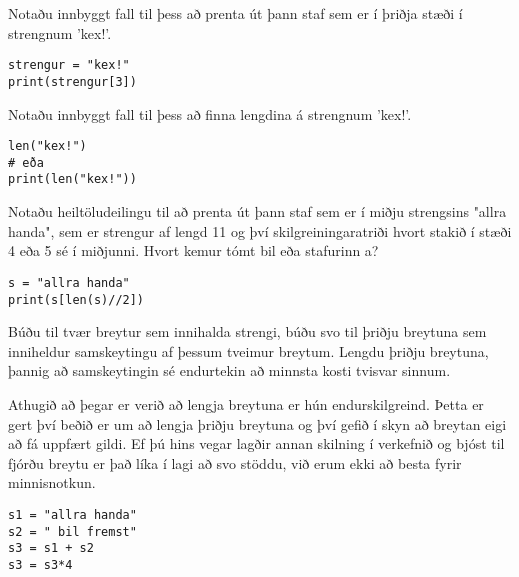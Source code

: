 \begin{exercise}\label{str4}
	Notaðu innbyggt fall til þess að prenta út þann staf sem er í þriðja stæði í strengnum 'kex!'.
\end{exercise}
\begin{Answer}[ref={str4}]
\begin{lstlisting}
strengur = "kex!"
print(strengur[3])\end{lstlisting}
\end{Answer}

\begin{exercise}\label{str4-5}
	Notaðu innbyggt fall til þess að finna lengdina á strengnum 'kex!'.
\end{exercise}
\begin{Answer}[ref={str4-5}]
\begin{lstlisting}
len("kex!")
# eða
print(len("kex!"))\end{lstlisting}
\end{Answer}

\begin{exercise}\label{str5}
	Notaðu heiltöludeilingu til að prenta út þann staf sem er í miðju strengsins "allra handa", sem er strengur af lengd 11 og því skilgreiningaratriði hvort stakið í stæði 4 eða 5 sé í miðjunni.
	Hvort kemur tómt bil eða stafurinn a?
\end{exercise}
\begin{Answer}[ref={str5}]
\begin{lstlisting}
s = "allra handa"
print(s[len(s)//2])\end{lstlisting}
\end{Answer}

\begin{exercise}\label{str6}
	Búðu til tvær breytur sem innihalda strengi, búðu svo til þriðju breytuna sem inniheldur samskeytingu af þessum tveimur breytum.
	Lengdu þriðju breytuna, þannig að samskeytingin sé endurtekin að minnsta kosti tvisvar sinnum.
\end{exercise}
\begin{Answer}[ref={str6}]
	Athugið að þegar er verið að lengja breytuna er hún endurskilgreind.
	Þetta er gert því beðið er um að lengja þriðju breytuna og því gefið í skyn að breytan eigi að fá uppfært gildi.
	Ef þú hins vegar lagðir annan skilning í verkefnið og bjóst til fjórðu breytu er það líka í lagi að svo stöddu, við erum ekki að besta fyrir minnisnotkun.
\begin{lstlisting}
s1 = "allra handa"
s2 = " bil fremst"
s3 = s1 + s2
s3 = s3*4\end{lstlisting}
\end{Answer}


